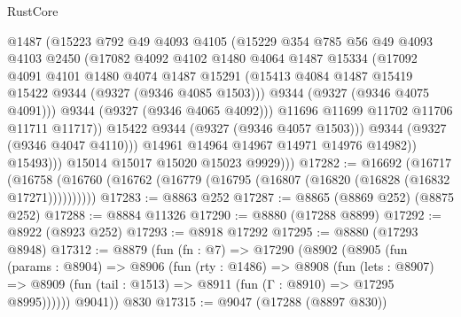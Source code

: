 \begin{lexlean}{RustCore}
\begin{coremodule}
                        @1487
                        (@15223
                          @792
                          @49
                          @4093
                          @4105
                          (@15229
                            @354
                            @785
                            @56
                            @49
                            @4093
                            @4103
                            @2450
                            (@17082
                              @4092
                              @4102
                              @1480
                              @4064
                              @1487
                              @15334
                              (@17092
                                @4091
                                @4101
                                @1480
                                @4074
                                @1487
                                @15291
                                (@15413 @4084 @1487 @15419 @15422 @9344 (@9327 (@9346 @4085 @1503)))
                                @9344
                                (@9327 (@9346 @4075 @4091)))
                              @9344
                              (@9327 (@9346 @4065 @4092)))
                            @11696
                            @11699
                            @11702
                            @11706
                            @11711
                            @11717))
                        @15422
                        @9344
                        (@9327 (@9346 @4057 @1503)))
                      @9344
                      (@9327 (@9346 @4047 @4110)))
                    @14961
                    @14964
                    @14967
                    @14971
                    @14976
                    @14982))
                @15493)))
          @15014
          @15017
          @15020
          @15023
          @9929)))
@17282 := @16692
    (@16717 (@16758 (@16760 (@16762 (@16779 (@16795 (@16807 (@16820 (@16828 (@16832 @17271))))))))))
@17283 := @8863 @252
@17287 := @8865 (@8869 @252) (@8875 @252)
@17288 := @8884 @11326
@17290 := @8880 (@17288 @8899)
@17292 := @8922 (@8923 @252)
@17293 := @8918 @17292
@17295 := @8880 (@17293 @8948)
@17312 := @8879
    (fun (fn : @7) =>
    @17290
      (@8902
        (@8905
          (fun (params : @8904) =>
          @8906
            (fun (rty : @1486) =>
            @8908
              (fun (lets : @8907) =>
              @8909 (fun (tail : @1513) => @8911 (fun (Γ : @8910) => @17295 @8995))))))
        @9041))
    @830
@17315 := @9047 (@17288 (@8897 @830))

\end{coremodule}
\end{lexlean}
